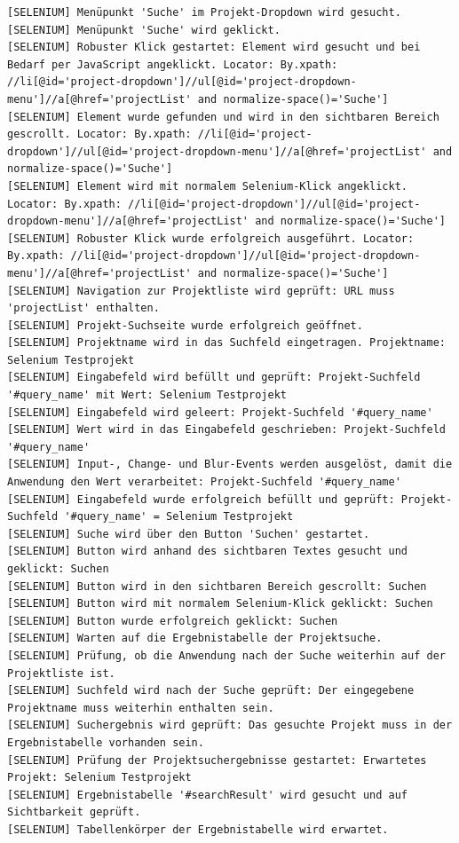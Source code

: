 \begin{lstlisting}[caption={Selenium -- Activity bearbeiten (Erfolgreich)}, label={lst:sel_edit_act_ok}, style=logStyle]
[SELENIUM] Menüpunkt 'Suche' im Projekt-Dropdown wird gesucht.
[SELENIUM] Menüpunkt 'Suche' wird geklickt.
[SELENIUM] Robuster Klick gestartet: Element wird gesucht und bei Bedarf per JavaScript angeklickt. Locator: By.xpath: //li[@id='project-dropdown']//ul[@id='project-dropdown-menu']//a[@href='projectList' and normalize-space()='Suche']
[SELENIUM] Element wurde gefunden und wird in den sichtbaren Bereich gescrollt. Locator: By.xpath: //li[@id='project-dropdown']//ul[@id='project-dropdown-menu']//a[@href='projectList' and normalize-space()='Suche']
[SELENIUM] Element wird mit normalem Selenium-Klick angeklickt. Locator: By.xpath: //li[@id='project-dropdown']//ul[@id='project-dropdown-menu']//a[@href='projectList' and normalize-space()='Suche']
[SELENIUM] Robuster Klick wurde erfolgreich ausgeführt. Locator: By.xpath: //li[@id='project-dropdown']//ul[@id='project-dropdown-menu']//a[@href='projectList' and normalize-space()='Suche']
[SELENIUM] Navigation zur Projektliste wird geprüft: URL muss 'projectList' enthalten.
[SELENIUM] Projekt-Suchseite wurde erfolgreich geöffnet.
[SELENIUM] Projektname wird in das Suchfeld eingetragen. Projektname: Selenium Testprojekt
[SELENIUM] Eingabefeld wird befüllt und geprüft: Projekt-Suchfeld '#query_name' mit Wert: Selenium Testprojekt
[SELENIUM] Eingabefeld wird geleert: Projekt-Suchfeld '#query_name'
[SELENIUM] Wert wird in das Eingabefeld geschrieben: Projekt-Suchfeld '#query_name'
[SELENIUM] Input-, Change- und Blur-Events werden ausgelöst, damit die Anwendung den Wert verarbeitet: Projekt-Suchfeld '#query_name'
[SELENIUM] Eingabefeld wurde erfolgreich befüllt und geprüft: Projekt-Suchfeld '#query_name' = Selenium Testprojekt
[SELENIUM] Suche wird über den Button 'Suchen' gestartet.
[SELENIUM] Button wird anhand des sichtbaren Textes gesucht und geklickt: Suchen
[SELENIUM] Button wird in den sichtbaren Bereich gescrollt: Suchen
[SELENIUM] Button wird mit normalem Selenium-Klick geklickt: Suchen
[SELENIUM] Button wurde erfolgreich geklickt: Suchen
[SELENIUM] Warten auf die Ergebnistabelle der Projektsuche.
[SELENIUM] Prüfung, ob die Anwendung nach der Suche weiterhin auf der Projektliste ist.
[SELENIUM] Suchfeld wird nach der Suche geprüft: Der eingegebene Projektname muss weiterhin enthalten sein.
[SELENIUM] Suchergebnis wird geprüft: Das gesuchte Projekt muss in der Ergebnistabelle vorhanden sein.
[SELENIUM] Prüfung der Projektsuchergebnisse gestartet: Erwartetes Projekt: Selenium Testprojekt
[SELENIUM] Ergebnistabelle '#searchResult' wird gesucht und auf Sichtbarkeit geprüft.
[SELENIUM] Tabellenkörper der Ergebnistabelle wird erwartet.

\end{lstlisting}
